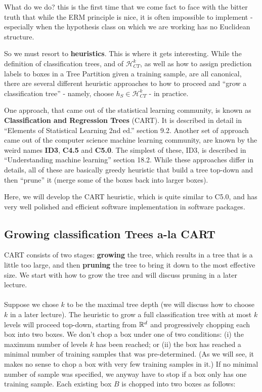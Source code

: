 \documentclass[11pt]{article}
\newcommand{\Hc}{\mathcal{H}}
\begin{document}
   What do we do? this is the first time that we come fact to face with the
   bitter truth that while the ERM principle is nice, it is often impossible to
   implement - especially when the hypothesis class on which we are working has
   no Euclidean structure. 

   So we must resort to {\bf heuristics}. This is where it gets interesting.
   While the definition of classification trees,  and of $\Hc^k_{CT}$, as well
   as how to assign prediction labels to boxes in a Tree Partition  given a
   training sample, are all canonical, there are several different heuristic
   approaches to how to proceed and ``grow a classification tree'' - namely,
   choose $h_S\in \Hc^k_{CT}$ - in practice. 

   One approach, that came out of the statistical learning community, is known
   as {\bf Classification and Regression Trees} (CART). It is described in
   detail in ``Elements of Statistical Learning 2nd ed.'' section 9.2. Another
   set of approach came out of the computer science machine learning community,
   are known by the weird names {\bf ID3}, {\bf C4.5} and {\bf C5.0}. The
 simplest of these, ID3, is described in ``Understanding machine learning''
 section 18.2. While these approaches differ in details, all of these are
 basically greedy heuristic that build a tree top-down and then ``prune'' it
 (merge some of the boxes back into larger boxes).

 Here, we will develop the CART heuristic, which is quite similar to C5.0, and has very well
 polished and efficient software implementation in software packages. 

 \subsection{Growing classification Trees a-la CART}

 CART consists of two stages: {\bf growing} the tree, which results in a tree
 that is a little too large, and then {\bf pruning} the tree to bring it down to
 the most effective size. We start with how to grow the tree and will discuss
 pruning in a later lecture. 
\\~\\
Suppose we chose $k$ to be the maximal tree depth (we will discuss how to choose
$k$ in a later lecture). The heuristic to grow a full classification
tree with at most $k$ levels will proceed top-down, starting from $\mathbb{R}^d$ and
progressively chopping each box into two boxes. We don't chop a box under one of
two conditions: (i) the maximum number of levels $k$ has been reached; or (ii)
the box has reached a minimal number of training samples that was
pre-determined. (As we will see, it makes no sense to chop a box with very few
training samples in it.) If no minimal number of sample was specified, we anyway
have to stop if a box only has one training sample. 
Each existing box $B$ is chopped into two
boxes as follows:
\end{document}
